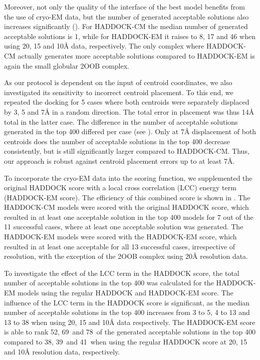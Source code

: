 Moreover, not only the quality of the interface of the best model benefits from
the use of cryo-EM data, but the number of generated acceptable solutions also
increases significantly (). For HADDOCK-CM the
median number of generated acceptable solutions is 1, while for HADDOCK-EM it
raises to 8, 17 and 46 when using 20, 15 and 10Å data, respectively. The
only complex where HADDOCK-CM actually generates more acceptable solutions
compared to HADDOCK-EM is again the small globular 2OOB complex.

As our protocol is dependent on the input of centroid coordinates, we also
investigated its sensitivity to incorrect centroid placement.  To this end, we
repeated the docking for 5 cases where both centroids were separately displaced
by 3, 5 and 7Å in a random direction.  The total error in placement
was thus 14Å total in the latter case. The difference in the number of
acceptable solutions generated in the top 400 differed per case (see
).  Only at 7Å displacement of
both centroids does the number of acceptable solutions in the top 400 decrease
consistently, but is still significantly larger compared to HADDOCK-CM.  Thus,
our approach is robust against centroid placement errors up to at least
7Å.




To incorporate the cryo-EM data into the scoring function, we supplemented the
original HADDOCK score with a local cross correlation (LCC) energy term
(HADDOCK-EM score).  The efficiency of this combined score is shown in
.  The HADDOCK-CM models were scored with the
original HADDOCK score, which resulted in at least one acceptable solution in
the top 400 models for 7 out of the 11 successful cases, where at least one
acceptable solution was generated.  The HADDOCK-EM models were scored with the
HADDOCK-EM score, which resulted in at least one acceptable for all 13
successful cases, irrespective of resolution, with the exception of the 2OOB
complex using 20Å resolution data. 

To investigate the effect of the LCC term in the HADDOCK score, the total
number of acceptable solutions in the top 400 was calculated for the HADDOCK-EM
models using the regular HADDOCK and HADDOCK-EM score.  The influence of the
LCC term in the HADDOCK score is significant, as the median number of
acceptable solutions in the top 400 increases from 3 to 5, 4 to 13 and 13 to 38
when using 20, 15 and 10Å data respectively.  The HADDOCK-EM score is
able to rank 52\percent, 69\percent\ and 78\percent\ of the generated acceptable solutions in the
top 400 compared to 38\percent, 39\percent\ and 41\percent\ when using the regular HADDOCK score at
20, 15 and 10Å resolution data, respectively.

